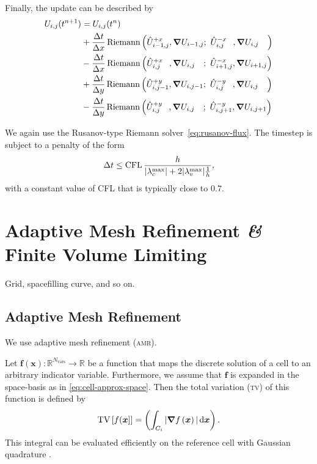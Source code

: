 Finally, the update can be described by
\begin{align}
  \begin{split}
    \cellAvg (t^{n+1}) &= \cellAvg (t^n)
    \\ &+
  \frac{\Delta t}{\Delta x}
    \Riemann \left(
      \evolvedCellAvg[i-1,j]{+x}, \gradCellAvg[i-1,j]; \ %
      \evolvedCellAvg[i,j\phantom{-1}]{-x}, \gradCellAvg[i,j\phantom{-1}]
    \right)
    \\ &-
  \frac{\Delta t}{\Delta x}
    \Riemann \left(
      \evolvedCellAvg[i,j\phantom{+1}]{+x}, \gradCellAvg[i,j\phantom{+1}]; \ %
      \evolvedCellAvg[i+1,j]{-x}, \gradCellAvg[i+1,j]
    \right)
    \\ &+
  \frac{\Delta t}{\Delta y}
    \Riemann \left(
      \evolvedCellAvg[i,j-1]{+y}, \gradCellAvg[i,j-1]; \ %
      \evolvedCellAvg[i,j\phantom{-1}]{-y}, \gradCellAvg[i,j\phantom{-1}]
    \right)
    \\ &-
  \frac{\Delta t}{\Delta y}
    \Riemann \left(
      \evolvedCellAvg[i,j\phantom{+1}]{+y}, \gradCellAvg[i,j\phantom{+1}]; \ %
      \evolvedCellAvg[i,j+1]{-y}, \gradCellAvg[i,j+1]
    \right)    
  \end{split}
\end{align}

We again use the Rusanov-type Riemann solver~\cref{eq:rusanov-flux}.
The timestep is subject to a penalty of the form
\begin{equation}\label{eq:cfl-muscl}
 \Delta t \leq  \text{CFL} \, \frac{h}{\maxConvEigen + 2 \maxViscEigen \frac{1}{h}},
\end{equation}
with a constant value of CFL that is typically close to $0.7$.

\section{Adaptive Mesh Refinement \textit{\&} Finite Volume Limiting}\label{sec:grid}
Grid, spacefilling curve, and so on.

\subsection{Adaptive Mesh Refinement}\label{sec:amr}
We use adaptive mesh refinement (\textsc{amr}).

Let $\bm{f}(\bm{x}): \mathbb{R}^{N_\text{vars}} \to \mathbb{R}$ be a function that maps the discrete solution of a cell to an arbitrary indicator variable.
Furthermore, we assume that $\bm{f}$ is expanded in the space-basis as in \cref{eq:cell-approx-space}.
Then the total variation (\textsc{tv}) of this function is defined by
\newcommand{\tv}{\operatorname{TV}}
\begin{equation}
  \label{eq:tv}
  \tv \left[ f(\bm{x}] \right] =
\left(\intdcell{ \vert \gradient{f \left( \bm{x} \right)} \vert } \right).
\end{equation}
This integral can be evaluated efficiently on the reference cell  with Gaussian quadrature .

